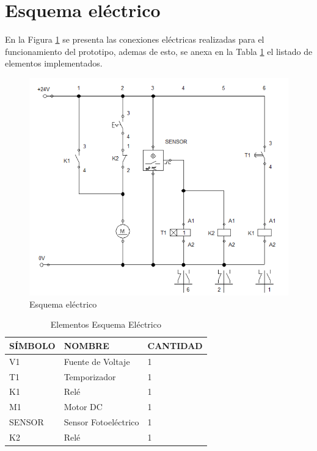 \newpage
\section{Esquema eléctrico}
En la Figura \ref{fig:Esquema} se presenta las conexiones eléctricas realizadas para el funcionamiento del prototipo, ademas de esto, se anexa en la Tabla \ref{table:esquema} el listado de elementos implementados.  
\begin{figure}[ht]
	\centering
	\includegraphics[scale=0.5]{Figs/66.png}
	\caption{Esquema eléctrico}
	\label{fig:Esquema}
\end{figure}

\begin{table}[ht]
	\centering
	\begin{tabular}{|p{2cm}|p{5cm}|p{3cm}|}
		\hline
		SÍMBOLO & NOMBRE & CANTIDAD \\ 
		\hline
		V1 & Fuente de Voltaje & 1 \\
		\hline
		T1 & Temporizador & 1 \\
		\hline
		K1 & Relé & 1 \\
		\hline
		M1 & Motor DC & 1 \\
		\hline
		SENSOR & Sensor Fotoeléctrico & 1 \\
		\hline
		K2 & Relé & 1 \\
		\hline
	\end{tabular}	
	\caption{Elementos Esquema Eléctrico}
	\label{table:esquema}
\end{table}	

